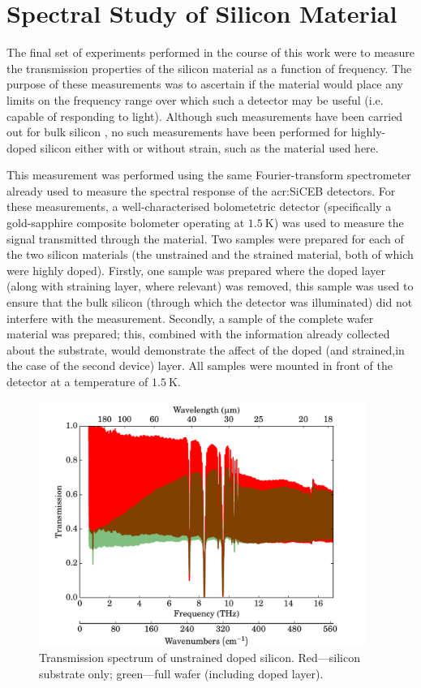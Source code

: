 \section{Spectral Study of Silicon Material}\label{sec:siliconFTS}
The final set of experiments performed in the course of this work were to measure the transmission properties of the silicon material as a function of frequency. The purpose of these measurements was to ascertain if the material would place any limits on the frequency range over which such a detector may be useful (i.e. capable of responding to light). Although such measurements have been carried out for bulk silicon \parencite[see for example][]{Hawkins1998}, no such measurements have been performed for highly-doped silicon  either with or without strain, such as the material used here.
\par 
This measurement was performed using the same Fourier-transform spectrometer already used to measure the spectral response of the \gls{acr:SiCEB} detectors. For these measurements, a well-characterised bolometetric detector (specifically a gold-sapphire composite bolometer operating at $1.5~\mathrm{K}$) was used to measure the signal transmitted through the material. Two samples were prepared for each of the two silicon materials (the unstrained and the strained material, both of which were highly doped). Firstly, one sample was prepared where the doped layer (along with straining layer, where relevant) was removed, this sample was used to ensure that the bulk silicon (through which the detector was illuminated) did not interfere with the measurement. Secondly, a sample of the complete wafer material was prepared; this, combined with the information already collected about the substrate, would demonstrate the affect of the doped (and strained,in the case of the second device) layer. All samples were mounted in front of the detector at a temperature of $1.5~\mathrm{K}$.
\begin{figure}[tb]
\begin{center}
\includegraphics[width = 0.95\textwidth]{figures/control_materialFTS}
\caption[Transmission spectrum of unstrained doped silicon]{Transmission spectrum of unstrained doped silicon. Red---silicon substrate only; green---full wafer (including doped layer).}
\label{fig:control_materialFTS}
\end{center}
\end{figure}

